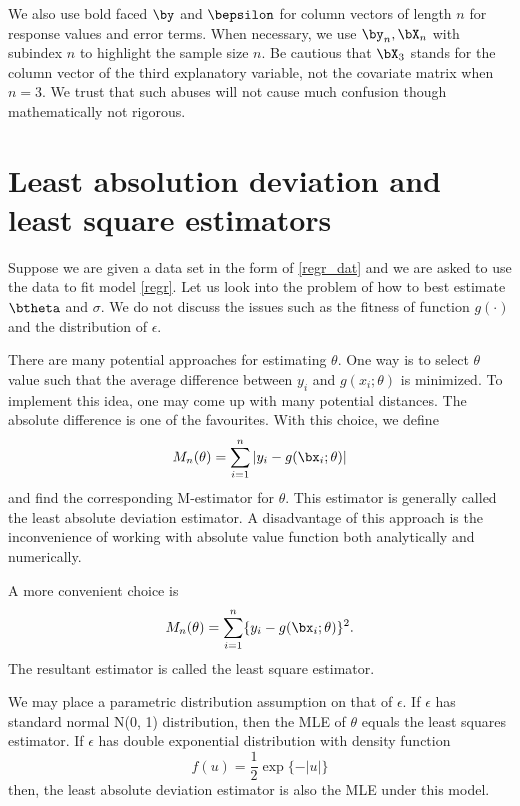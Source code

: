 We also use bold faced $\by$ and $\bepsilon$ for column vectors of
length $n$ for response values and error terms. When necessary, we
use $\by_n, \bX_n$ with subindex $n$ to highlight the sample size
$n$. Be cautious that $\bX_3$ stands for the column vector of the
third explanatory variable, not the covariate matrix when $n=3$.
We trust that such abuses will not cause much confusion though 
mathematically not rigorous.

\section{Least absolution deviation and least square estimators}

Suppose we are given a data set in the form of \eqref{regr_dat}
and we are asked to use the data to fit model \eqref{regr}.
Let us look into the problem of how to best estimate $\btheta$ and
$\sigma$. We do not discuss the issues such as the fitness
of function $g(\cdot)$ and the distribution of $\epsilon$.

There are many potential approaches for estimating $\theta$.
One way is to select $\theta$ value such that the average
difference between $y_i$ and $g(x_i; \theta)$ is minimized.
To implement this idea, one may come up with many potential distances.
The absolute difference is one of the favourites. 
With this choice, we define
\[
M_n(\theta) = \sum_{i=1}^n | y_i - g(\bx_i; \theta)|
\]
and find the corresponding M-estimator for $\theta$. This estimator
is generally called the least absolute deviation estimator.
A disadvantage of this approach is the inconvenience of
working with absolute value function both analytically
and numerically.

A more convenient choice is
\[
M_n(\theta) = \sum_{i=1}^n \{ y_i - g(\bx_i; \theta)\}^2.
\]
The resultant estimator is called the least square estimator.

We may place a parametric distribution assumption on that of
$\epsilon$. If $\epsilon$ has standard normal N(0, 1)
distribution, then the MLE of $\theta$ equals the least 
squares estimator.
If $\epsilon$ has double exponential distribution with
density function
\[
f(u) = \frac{1}{2} \exp \{ - |u| \}
\]
then, the least absolute deviation estimator is also
the MLE under this model. 

